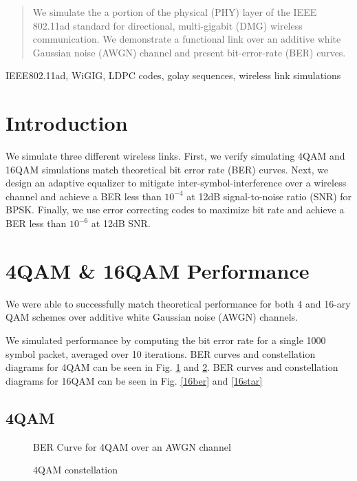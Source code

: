\documentclass[conference]{IEEEtran}
\begin{document}
\begin{abstract}
We simulate the a portion of the physical (PHY) layer of the IEEE 802.11ad standard for directional, multi-gigabit (DMG) wireless communication. We demonstrate a functional link over an additive white Gaussian noise (AWGN) channel and present bit-error-rate (BER) curves. 
\end{abstract}

\begin{IEEEkeywords}
IEEE802.11ad, WiGIG, LDPC codes, golay sequences, wireless link simulations
\end{IEEEkeywords}

\section{Introduction}
We simulate three different wireless links. First, we verify simulating 4QAM and 16QAM simulations match theoretical bit error rate (BER) curves. Next, we design an adaptive equalizer to mitigate inter-symbol-interference over a wireless channel and achieve a BER less than $10^{-4}$ at 12dB signal-to-noise ratio (SNR) for BPSK. Finally, we use error correcting codes to maximize bit rate and achieve a BER less than $10^{-6}$ at 12dB SNR.

\section{4QAM \& 16QAM Performance}
We were able to successfully match theoretical performance for both 4 and 16-ary QAM schemes over additive white Gaussian noise (AWGN) channels. 

We simulated performance by computing the bit error rate for a single 1000 symbol packet, averaged over 10 iterations. BER curves and constellation diagrams for 4QAM can be seen in Fig. \ref{4ber} and \ref{4star}. BER curves and constellation diagrams for 16QAM can be seen in Fig. \ref{16ber} and \ref{16star}
\subsection{4QAM}
\begin{figure}[htbp]
\caption{BER Curve for 4QAM over an AWGN channel}
\label{4ber}
\end{figure}
\begin{figure}[htbp]
\caption{4QAM constellation}
\label{4star}
\end{figure}
\end{document}
